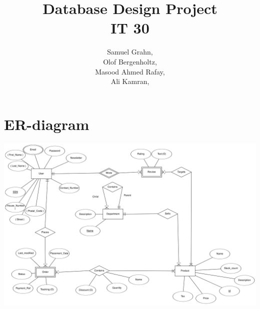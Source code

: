 \documentclass{article}
\title{
  Database Design Project\\
  IT 30
}
\author{
  Samuel Grahn, \email{samuel.grahn@outlook.com}\\
  Olof Bergenholtz, \email{obergenholtz@gmail.com}\\
  Masood Ahmed Rafay, \email{Rafayqureshi2010@gmail.com}\\
  Ali Kamran, \email{alkmrn1@gmail.com}\\
}
\begin{document}
\maketitle
\newpage
\section*{ER-diagram}
\includegraphics[height=\linewidth,angle=90]{er.png}
%
\end{document}
